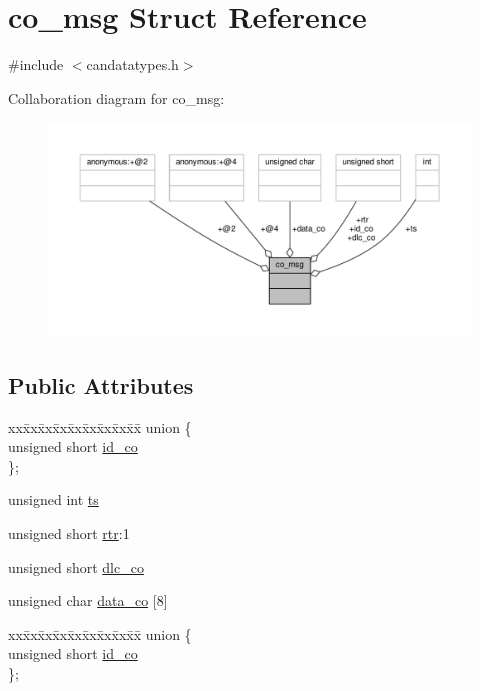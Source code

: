 \hypertarget{structco__msg}{}\section{co\+\_\+msg Struct Reference}
\label{structco__msg}


{\ttfamily \#include $<$candatatypes.\+h$>$}



Collaboration diagram for co\+\_\+msg\+:\nopagebreak
\begin{figure}[H]
\begin{center}
\leavevmode
\includegraphics[width=350pt]{structco__msg__coll__graph}
\end{center}
\end{figure}
\subsection*{Public Attributes}
\begin{DoxyCompactItemize}
\item 
\begin{tabbing}
xx\=xx\=xx\=xx\=xx\=xx\=xx\=xx\=xx\=\kill
union \{\\
\>unsigned short \hyperlink{structco__msg_a634de83979d7da90565eccdf16304a07}{id\_co}\\
\}; \\

\end{tabbing}\item 
unsigned int \hyperlink{structco__msg_aaf8cd43d17baf495c982c87866fc90b2}{ts}
\item 
unsigned short \hyperlink{structco__msg_a4352880745fa6bc63d6c4e3c77870029}{rtr}\+:1
\item 
unsigned short \hyperlink{structco__msg_ab19d6996baf97d346427d9789d7e4a6b}{dlc\+\_\+co}
\item 
unsigned char \hyperlink{structco__msg_a3ced1bf4d72ca82fe53c829d42cd946e}{data\+\_\+co} \mbox{[}8\mbox{]}
\item 
\begin{tabbing}
xx\=xx\=xx\=xx\=xx\=xx\=xx\=xx\=xx\=\kill
union \{\\
\>unsigned short \hyperlink{structco__msg_a634de83979d7da90565eccdf16304a07}{id\_co}\\
\}; \\

\end{tabbing}\end{DoxyCompactItemize}



